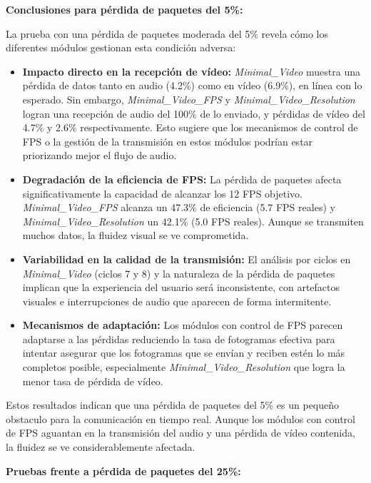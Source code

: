 \vspace{\baselineskip}

\textbf{Conclusiones para pérdida de paquetes del 5\%:}

La prueba con una pérdida de paquetes moderada del 5\% revela cómo los diferentes módulos gestionan esta condición adversa:

\begin{itemize}
\item \textbf{Impacto directo en la recepción de vídeo:} \textit{Minimal\_Video} muestra una pérdida de datos tanto en audio (4.2\%) como en vídeo (6.9\%), en línea con lo esperado. Sin embargo, \textit{Minimal\_Video\_FPS} y \textit{Minimal\_Video\_Resolution} logran una recepción de audio del 100\% de lo enviado, y pérdidas de vídeo del 4.7\% y 2.6\% respectivamente. Esto sugiere que los mecanismos de control de FPS o la gestión de la transmisión en estos módulos podrían estar priorizando mejor el flujo de audio.
\item \textbf{Degradación de la eficiencia de FPS:} La pérdida de paquetes afecta significativamente la capacidad de alcanzar los 12 FPS objetivo. \textit{Minimal\_Video\_FPS} alcanza un 47.3\% de eficiencia (5.7 FPS reales) y \textit{Minimal\_Video\_Resolution} un 42.1\% (5.0 FPS reales). Aunque se transmiten muchos datos, la fluidez visual se ve comprometida.
\item \textbf{Variabilidad en la calidad de la transmisión:} El análisis por ciclos en \textit{Minimal\_Video} (ciclos 7 y 8) y la naturaleza de la pérdida de paquetes implican que la experiencia del usuario será inconsistente, con artefactos visuales e interrupciones de audio que aparecen de forma intermitente.
\item \textbf{Mecanismos de adaptación:} Los módulos con control de FPS parecen adaptarse a las pérdidas reduciendo la tasa de fotogramas efectiva para intentar asegurar que los fotogramas que se envían y reciben estén lo más completos posible, especialmente \textit{Minimal\_Video\_Resolution} que logra la menor tasa de pérdida de vídeo.
\end{itemize}

Estos resultados indican que una pérdida de paquetes del 5\% es un pequeño obstaculo para la comunicación en tiempo real. Aunque los módulos con control de FPS aguantan en la transmisión del audio y una pérdida de vídeo contenida, la fluidez se ve considerablemente afectada.
\newpage

\textbf{Pruebas frente a pérdida de paquetes del 25\%:}
\vspace{\baselineskip}

